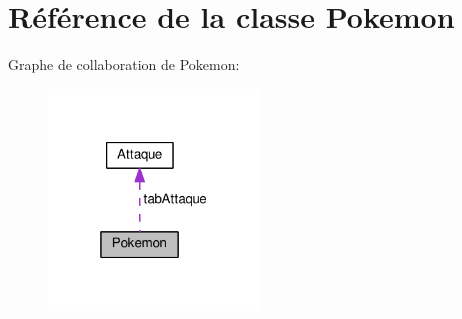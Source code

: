 \hypertarget{class_pokemon}{}\section{Référence de la classe Pokemon}
\label{class_pokemon}


Graphe de collaboration de Pokemon\+:\nopagebreak
\begin{figure}[H]
\begin{center}
\leavevmode
\includegraphics[width=160pt]{class_pokemon__coll__graph}
\end{center}
\end{figure}
